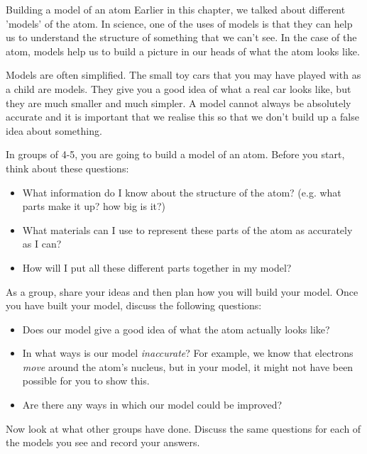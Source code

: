 \begin{groupdiscussion}{Building a model of an atom }
            \nopagebreak
            \label{m38741*id260472}Earlier in this chapter, we talked about different 'models' of the atom. In science, one of the uses of models is that they can help us to understand the structure of something that we can't see. In the case of the atom, models help us to build a picture in our heads of what the atom looks like.\par 
        \label{m38741*id260480}Models are often simplified. The small toy cars that you may have played with as a child are models. They give you a good idea of what a real car looks like, but they are much smaller and much simpler. A model cannot always be absolutely accurate and it is important that we realise this so that we don't build up a false idea about something.\par 
        \label{m38741*id260488}In groups of 4-5, you are going to build a model of an atom. Before you start, think about these questions:\par 
        \label{m38741*id260495}\begin{itemize}[noitemsep]
            \label{m38741*uid114}\item What information do I know about the structure of the atom? (e.g. what parts make it up? how big is it?)
\label{m38741*uid115}\item What materials can I use to represent these parts of the atom as accurately as I can?
\label{m38741*uid116}\item How will I put all these different parts together in my model?
\end{itemize}
        \label{m38741*id260537}As a group, share your ideas and then plan how you will build your model. Once you have built your model, discuss the following questions:\par 
        \label{m38741*id260542}\begin{itemize}[noitemsep]
            \label{m38741*uid117}\item Does our model give a good idea of what the atom actually looks like?
\label{m38741*uid118}\item In what ways is our model \textsl{inaccurate}? For example, we know that electrons \textsl{move} around the atom's nucleus, but in your model, it might not have been possible for you to show this.
\label{m38741*uid119}\item Are there any ways in which our model could be improved?
\end{itemize}
        \label{m38741*id260596}Now look at what other groups have done. Discuss the same questions for each of the models you see and record your answers. \par 
\end{groupdiscussion}      


